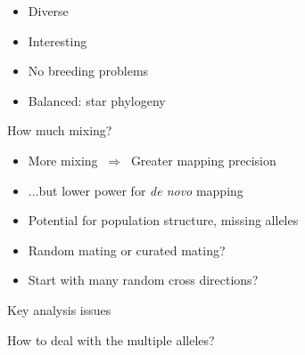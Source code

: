 \documentclass[12pt]{article}
\newcommand{\headsize}{\fontsize{35}{35} \selectfont}
\newcommand{\smallsize}{\fontsize{25}{30} \selectfont}
\begin{document}
\vspace{35mm}

\color{mywhite}
\smallsize

\hfill \begin{minipage}{9.5in}
\begin{itemize}
\itemsep24pt
\item Diverse
\item Interesting
\item No breeding problems
\item Balanced: star phylogeny
\end{itemize}
\end{minipage}


\newpage


\headsize \color{myyellow}
\hfill \begin{minipage}{5.75in}
\centering
How much mixing?
\end{minipage}

\vspace{25mm}

\color{mywhite}
\smallsize

\hfill \begin{minipage}{10in}
\begin{itemize}
\itemsep24pt
\item More mixing $ \ \Rightarrow \ $ Greater mapping precision
\item ...but lower power for \emph{de novo\/} mapping
\item Potential for population structure, missing alleles
\color{myblue}
\item Random mating or curated mating?
\item Start with many random cross directions?
\end{itemize}
\end{minipage}




\newpage


\headsize \color{myyellow}
\hfill \begin{minipage}{5.75in}
\centering
Key analysis issues
\end{minipage}

\vspace{25mm}

\color{mywhite}
\smallsize

\hfill \begin{minipage}{9.5in}
How to deal with the multiple alleles?
\end{minipage}

\vspace{10mm}
\end{document}
